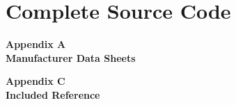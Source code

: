 \documentclass[letter,twocolumn]{report}
\begin{document}
	
	\printbibliography		
	
	\section{Complete Source Code}
		
	
	\begin{appendices}
		\begin{center}
			\textbf{\vspace{0.35\textheight}\Huge Appendix A\label{app:mq6} \\Manufacturer Data Sheets}
			\newpage	
		\end{center}
		
		 
		\newpage
		
		\newpage
		
		\newpage
		
		
		
		\begin{center}
			\textbf{\vspace{0.35\textheight}\Huge Appendix C\label{refs} \\Included Reference}
			\newpage
		\end{center}
	
	\end{appendices}	
\end{document}
